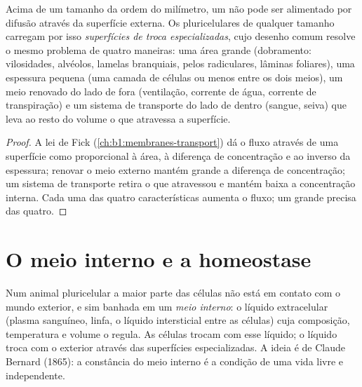 \begin{proposition}\label{prop:b1:organism-environment:surfaces}
Acima de um tamanho da ordem do milímetro, um  não pode ser
alimentado por difusão através da superfície externa. Os 
pluricelulares de qualquer tamanho carregam por isso
\emph{superfícies de troca especializadas}, cujo desenho comum resolve o mesmo problema de quatro maneiras: uma
área grande (dobramento: vilosidades, alvéolos, lamelas branquiais,
pelos radiculares, lâminas foliares), uma espessura pequena (uma camada
de células ou menos entre os dois meios), um meio renovado do lado de
fora (ventilação, corrente de água, corrente de transpiração) e um
sistema de transporte do lado de dentro (sangue, seiva) que leva ao
resto do volume o que atravessa a superfície.
\end{proposition}
\begin{proof}
A lei de Fick (\cref{ch:b1:membranes-transport}) dá o fluxo através de
uma superfície como proporcional à área, à diferença de concentração e
ao inverso da espessura; renovar o meio externo mantém grande a
diferença de concentração; um sistema de transporte retira o que
atravessou e mantém baixa a concentração interna. Cada uma das quatro
características aumenta o fluxo; um  grande precisa das quatro.
\end{proof}

\section{O meio interno e a homeostase}

\begin{definition}\label{def:b1:organism-environment:milieu}
Num animal pluricelular a maior parte das células não está em contato
com o mundo exterior, e sim banhada em um \emph{meio interno}: o líquido extracelular (plasma sanguíneo, linfa, o líquido
intersticial entre as células) cuja composição, temperatura e volume o
 regula. As células trocam com esse líquido; o líquido troca
com o exterior através das superfícies especializadas. A ideia é de
Claude Bernard (1865): a constância do meio interno é a condição de uma
vida livre e independente.
\end{definition}

